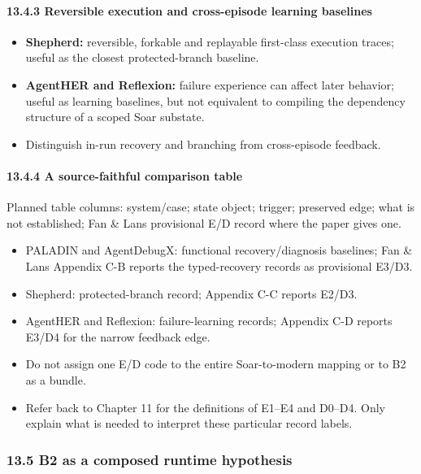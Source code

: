 \paragraph{13.4.3 Reversible execution and cross-episode learning baselines}\label{1343-reversible-execution-and-cross-episode-learning-baselines}

\begin{itemize}
\tightlist
\item
  \textbf{Shepherd:} reversible, forkable and replayable first-class execution traces; useful as the closest protected-branch baseline.
\item
  \textbf{AgentHER and Reflexion:} failure experience can affect later behavior; useful as learning baselines, but not equivalent to compiling the dependency structure of a scoped Soar substate.
\item
  Distinguish in-run recovery and branching from cross-episode feedback.
\end{itemize}

\paragraph{13.4.4 A source-faithful comparison table}\label{1344-a-source-faithful-comparison-table}

Planned table columns: system/case; state object; trigger; preserved edge; what is not established; Fan \& Lan\textquotesingle s provisional E/D record where the paper gives one.

\begin{itemize}
\tightlist
\item
  PALADIN and AgentDebugX: functional recovery/diagnosis baselines; Fan \& Lan\textquotesingle s Appendix C-B reports the typed-recovery records as provisional E3/D3.
\item
  Shepherd: protected-branch record; Appendix C-C reports E2/D3.
\item
  AgentHER and Reflexion: failure-learning records; Appendix C-D reports E3/D4 for the narrow feedback edge.
\item
  Do not assign one E/D code to the entire Soar-to-modern mapping or to B2 as a bundle.
\item
  Refer back to Chapter 11 for the definitions of E1--E4 and D0--D4. Only explain what is needed to interpret these particular record labels.
\end{itemize}

\subsubsection{13.5 B2 as a composed runtime hypothesis}\label{135-b2-as-a-composed-runtime-hypothesis}

